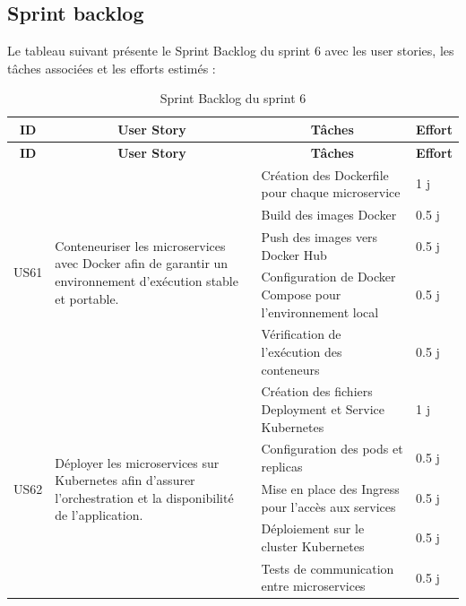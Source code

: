 \subsection{Sprint backlog} 
Le tableau suivant présente le Sprint Backlog du sprint 6 avec les user stories, les tâches associées et les efforts estimés : 
\begin{longtable}{|p{1cm}|p{4.7cm}|p{7cm}|p{1.3cm}|}

\caption{Sprint Backlog du sprint 6} \label{tab:sprint6-backlog} \\

\hline
\multicolumn{1}{|c|}{\cellcolor{coloranihub}\textbf{ID}} &
\multicolumn{1}{c|}{\cellcolor{coloranihub}\textbf{User Story}} &
\multicolumn{1}{c|}{\cellcolor{coloranihub}\textbf{Tâches}} &
\multicolumn{1}{c|}{\cellcolor{coloranihub}\textbf{Effort}} \\
\hline
\endfirsthead

\hline
\multicolumn{1}{|c|}{\cellcolor{coloranihub}\textbf{ID}} &
\multicolumn{1}{c|}{\cellcolor{coloranihub}\textbf{User Story}} &
\multicolumn{1}{c|}{\cellcolor{coloranihub}\textbf{Tâches}} &
\multicolumn{1}{c|}{\cellcolor{coloranihub}\textbf{Effort}} \\
\hline
\endhead

\multirow{5}{2cm}{US61}
& \multirow{5}{5cm}{Conteneuriser les microservices avec Docker afin de garantir un environnement d’exécution stable et portable.}
& Création des Dockerfile pour chaque microservice & 1 j \\
\cline{3-4}
& & Build des images Docker & 0.5 j \\
\cline{3-4}
& & Push des images vers Docker Hub & 0.5 j \\
\cline{3-4}
& & Configuration de Docker Compose pour l’environnement local & 0.5 j \\
\cline{3-4}
& & Vérification de l’exécution des conteneurs & 0.5 j \\
\hline

\multirow{5}{2cm}{US62}
& \multirow{5}{5cm}{Déployer les microservices sur Kubernetes afin d’assurer l’orchestration et la disponibilité de l’application.}
& Création des fichiers Deployment et Service Kubernetes & 1 j \\
\cline{3-4}
& & Configuration des pods et replicas & 0.5 j \\
\cline{3-4}
& & Mise en place des Ingress pour l’accès aux services & 0.5 j \\
\cline{3-4}
& & Déploiement sur le cluster Kubernetes & 0.5 j \\
\cline{3-4}
& & Tests de communication entre microservices & 0.5 j \\
\hline


\end{longtable}
